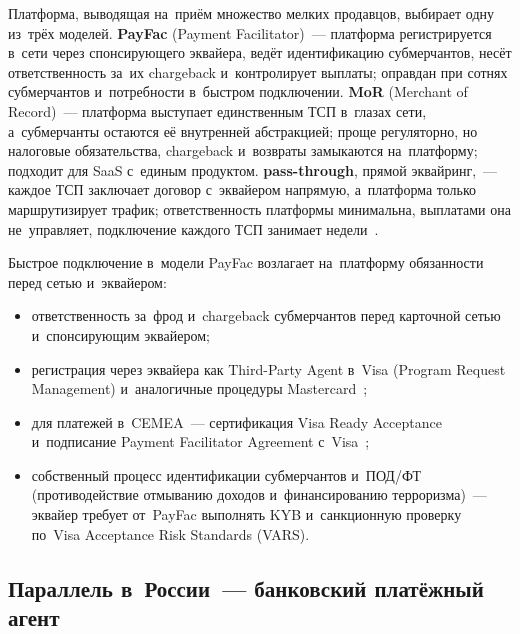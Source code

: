Платформа, выводящая на~приём множество мелких продавцов, выбирает одну из~трёх
моделей. \textbf{PayFac} (Payment Facilitator)~--- платформа регистрируется
в~сети через спонсирующего эквайера, ведёт идентификацию субмерчантов, несёт
ответственность за~их chargeback и~контролирует выплаты; оправдан при сотнях
субмерчантов и~потребности в~быстром подключении. \textbf{MoR} (Merchant of
Record)~--- платформа выступает единственным ТСП в~глазах сети, а~субмерчанты
остаются её внутренней абстракцией; проще регуляторно, но налоговые
обязательства, chargeback и~возвраты замыкаются на~платформу; подходит для SaaS
с~единым продуктом. \textbf{pass-through}, прямой эквайринг,~--- каждое ТСП
заключает договор с~эквайером напрямую, а~платформа только маршрутизирует
трафик; ответственность платформы минимальна, выплатами она не~управляет,
подключение каждого ТСП занимает недели~\cite{visa-acceptance-entities}.

Быстрое подключение в~модели PayFac возлагает на~платформу обязанности перед
сетью и~эквайером:
\begin{itemize}
  \item ответственность за~фрод и~chargeback субмерчантов перед
    карточной сетью и~спонсирующим эквайером;
  \item регистрация через эквайера как Third-Party Agent в~Visa (Program
    Request Management) и~аналогичные процедуры
    Mastercard~\cite{visa-payment-facilitator-marketplace-risk-guide};
  \item для платежей в~CEMEA~--- сертификация Visa Ready Acceptance
    и~подписание Payment Facilitator Agreement
    с~Visa~\cite{visa-payment-facilitator-marketplace-risk-guide};
  \item собственный процесс идентификации субмерчантов и~ПОД/ФТ
    (противодействие отмыванию доходов и~финансированию терроризма)~---
    эквайер требует от~PayFac выполнять KYB и~санкционную проверку по~Visa
    Acceptance Risk Standards (VARS).
\end{itemize}


\subsection*{Параллель в~России~--- банковский платёжный агент}

